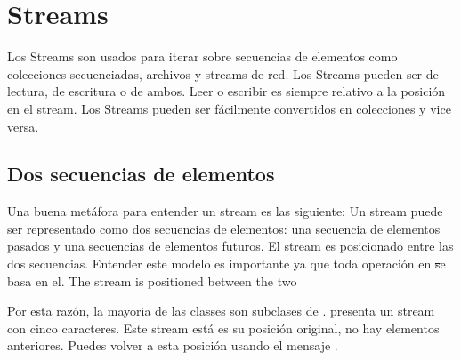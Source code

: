 \documentclass[a4paper,10pt,twoside]{book}
\begin{document}
	\sloppy
\fi
\chapter{Streams}


Los Streams son usados para iterar sobre secuencias de elementos como colecciones secuenciadas, archivos y streams de red.
Los Streams pueden ser de lectura, de escritura o de ambos.
Leer o escribir es siempre relativo a la posici\'on en el stream.
Los Streams pueden ser f\'acilmente convertidos en colecciones y vice versa.


\section{Dos secuencias de elementos}
Una buena met\'afora para entender un stream es las siguiente: Un stream puede ser representado como dos secuencias de elementos: una secuencia de 
elementos pasados y una secuencias de elementos futuros.
El stream es posicionado entre las dos secuencias. Entender este modelo es importante ya que toda operaci\'on en \st se basa en el.
The stream is positioned between the two

Por esta raz\'on, la mayoria de las classes  son subclases de .
 presenta un stream con cinco caracteres. Este stream est\'a es su posici\'on original, \ie no hay elementos anteriores. 
Puedes volver a esta posici\'on usando el mensaje .
\end{document}

